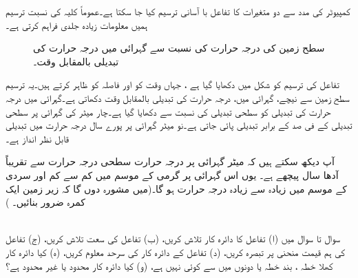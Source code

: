 کمپیوٹر کی مدد سے  دو متغیرات کا  تفاعل با آسانی   ترسیم کیا جا سکتا ہے۔عموماً    کلیہ کی نسبت ترسیم ہمیں     معلومات  زیادہ    جلدی فراہم کرتی ہے۔

\begin{figure}
\centering
{}
\caption
{سطح زمین کی  درجہ حرارت  کی نسبت سے گہرائی میں درجہ حرارت کی تبدیلی بالمقابل وقت۔}
\label{شکل_مثال_کثیر_المتغیر_گہرائی_درجہ_حرارت}
\end{figure}

تفاعل  کی  ترسیم کو شکل   میں دکھایا گیا ہے ، جہاں وقت  کو     اور  فاصلہ کو      ظاہر کرتے ہیں۔یہ ترسیم  سطح زمین سے نیچے، گہرائی میں،  درجہ حرارت کی تبدیلی بالمقابل وقت دکھاتی ہے۔گہرائی میں درجہ حرارت کی تبدیلی   کو سطحی تبدیلی کی نسبت سے دکھایا گیا ہے۔چار  میٹر کی گہرائی پر سطحی تبدیلی کے  فی صد کے برابر  تبدیلی پائی جاتی ہے۔نو  میٹر گہرائی پر  پورے سال  درجہ حرارت میں تبدیلی  قابل نظر انداز ہے۔

آپ دیکھ سکتے ہیں کہ  میٹر گہرائی پر درجہ حرارت سطحی درجہ حرارت سے تقریباً آدھا سال پیچھے    ہے۔ یوں اس گہرائی پر  گرمی کے  موسم میں  کم سے کم اور  سردی کے  موسم میں  زیادہ سے زیادہ  درجہ حرارت ہو گا۔(میں مشورہ  دوں گا کہ زیر زمین ایک کمرہ ضرور بنائیں۔ )

\\
سوال  تا سوال  میں (ا) تفاعل کا دائرہ کار تلاش کریں، (ب) تفاعل کی سعت تلاش کریں، (ج) تفاعل کی ہم قیمت  منحنی پر تبصرہ کریں، (د)  تفاعل کے دائرہ کار کی سرحد معلوم کریں، (ہ) کیا دائرہ کار کھلا خطہ ، بند خطہ یا دونوں میں سے کوئی نہیں ہے، (و) کیا دائرہ کار محدود یا غیر محدود ہے؟

